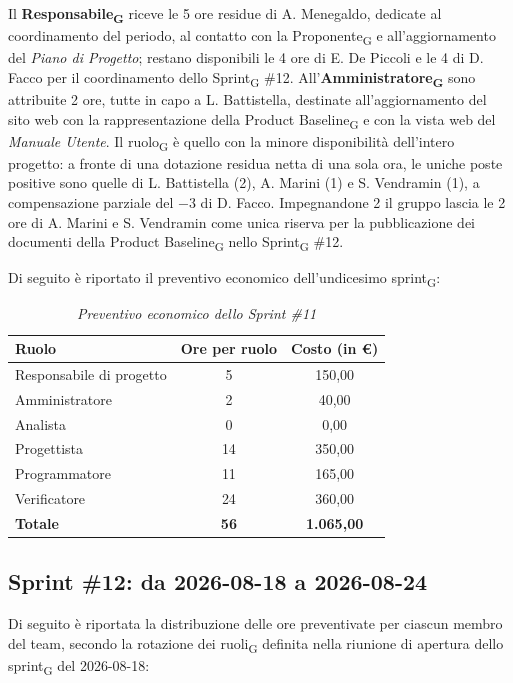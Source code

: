 ﻿\documentclass[a4paper, 10pt, colorlinks=true, linkcolor=black, urlcolor=blue, citecolor=blue, hidelinks]{article}
\renewcommand{\arraystretch}{1.2}
\begin{document}
Il \textbf{Responsabile\textsubscript{G}} riceve le 5 ore residue di A. Menegaldo, dedicate al coordinamento del periodo, al contatto con la Proponente\textsubscript{G} e all'aggiornamento del \textit{Piano di Progetto}; restano disponibili le 4 ore di E. De Piccoli e le 4 di D. Facco per il coordinamento dello Sprint\textsubscript{G} \#12. All'\textbf{Amministratore\textsubscript{G}} sono attribuite 2 ore, tutte in capo a L. Battistella, destinate all'aggiornamento del sito web con la rappresentazione della Product Baseline\textsubscript{G} e con la vista web del \textit{Manuale Utente}. Il ruolo\textsubscript{G} è quello con la minore disponibilità dell'intero progetto: a fronte di una dotazione residua netta di una sola ora, le uniche poste positive sono quelle di L. Battistella (2), A. Marini (1) e S. Vendramin (1), a compensazione parziale del $-3$ di D. Facco. Impegnandone 2 il gruppo lascia le 2 ore di A. Marini e S. Vendramin come unica riserva per la pubblicazione dei documenti della Product Baseline\textsubscript{G} nello Sprint\textsubscript{G} \#12.

Di seguito è riportato il preventivo economico dell'undicesimo sprint\textsubscript{G}:

\begin{table}[H]
    \centering
    \renewcommand{\arraystretch}{1.4}
    \begin{tabular}{|l|c|c|}
        \hline
        \rowcolor{bluBitless!15}
        \textbf{Ruolo} & \textbf{Ore per ruolo} & \textbf{Costo (in €)} \\
        \hline
        Responsabile di progetto & 5 & 150,00 \\ \hline
        Amministratore & 2 & 40,00 \\ \hline
        Analista & 0 & 0,00 \\ \hline
        Progettista & 14 & 350,00 \\ \hline
        Programmatore & 11 & 165,00 \\ \hline
        Verificatore & 24 & 360,00 \\ \hline
        \rowcolor{bluBitless!8}
        \textbf{Totale} & \textbf{56} & \textbf{1.065,00} \\ \hline
    \end{tabular}
    \caption{\textit{Preventivo economico dello Sprint \#11}}
\end{table}

\subsection{Sprint \#12: da 2026-08-18 a 2026-08-24}
Di seguito è riportata la distribuzione delle ore preventivate per ciascun membro del team, secondo la rotazione dei ruoli\textsubscript{G} definita nella riunione di apertura dello sprint\textsubscript{G} del 2026-08-18:
\end{document}
